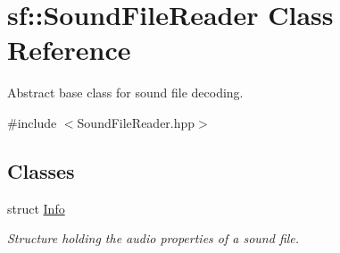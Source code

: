 \hypertarget{classsf_1_1_sound_file_reader}{\section{sf\-:\-:Sound\-File\-Reader Class Reference}
\label{classsf_1_1_sound_file_reader}
}


Abstract base class for sound file decoding.  




{\ttfamily \#include $<$Sound\-File\-Reader.\-hpp$>$}

\subsection*{Classes}
\begin{DoxyCompactItemize}
\item 
struct \hyperlink{structsf_1_1_sound_file_reader_1_1_info}{Info}
\begin{DoxyCompactList}\small\item\em Structure holding the audio properties of a sound file. \end{DoxyCompactList}\end{DoxyCompactItemize}
